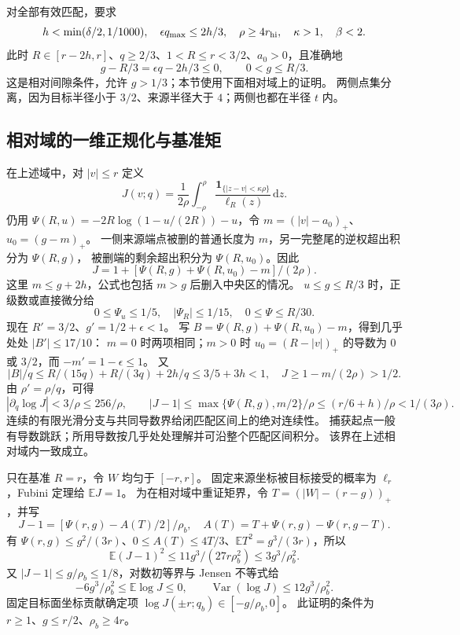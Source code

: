 \documentclass[UTF8,a4paper,11pt,fontset=fandol]{ctexart}
\theoremstyle{remark}
\newcommand{\one}{\mathbf 1}
\newcommand{\dint}{\,\mathrm d}
\begin{document}
对全部有效匹配，要求
\begin{equation}\label{eq:relative-guards}
 h<\min(\delta/2,1/1000),\quad\epsilon q_{\max}\le2h/3,
 \quad\rho\ge4r_{\rm hi},\quad\kappa>1,\quad\beta<2.
\end{equation}
此时 $R\in[r-2h,r]$、$q\ge2/3$、$1<R\le r<3/2$、$a_0>0$，且准确地
\[
 g-R/3=\epsilon q-2h/3\le0,\qquad0<g\le R/3.
\]
这是相对间隙条件，允许 $g>1/3$；本节使用下面相对域上的证明。
两侧点集分离，因为目标半径小于 $3/2$、来源半径大于 $4$；两侧也都在半径 $t$ 内。

\subsection{相对域的一维正规化与基准矩}\label{subsec:relative-J}
在上述域中，对 $|v|\le r$ 定义
\[
 J(v;q)=\frac1{2\rho}\int_{-\rho}^{\rho}
 \frac{\one_{\{|z-v|<\kappa\rho\}}}{\ell_R(z)}\dint z.
\]
仍用 $\Psi(R,u)=-2R\log(1-u/(2R))-u$，令
$m=(|v|-a_0)_+$、$u_0=(g-m)_+$。
一侧来源端点被删的普通长度为 $m$，另一完整尾的逆权超出积分为 $\Psi(R,g)$，
被删端的剩余超出积分为 $\Psi(R,u_0)$。因此
\begin{equation}\label{eq:relative-J-closed}
 J=1+[\Psi(R,g)+\Psi(R,u_0)-m]/(2\rho).
\end{equation}
这里 $m\le g+2h$，公式也包括 $m>g$ 后删入中央区的情况。
$u\le g\le R/3$ 时，正级数或直接微分给
\[
 0\le\Psi_u\le1/5,\quad|\Psi_R|\le1/15,\quad0\le\Psi\le R/30.
\]
现在 $R'=3/2$、$g'=1/2+\epsilon<1$。
写 $B=\Psi(R,g)+\Psi(R,u_0)-m$，得到几乎处处 $|B'|\le17/10$：
$m=0$ 时两项相同；$m>0$ 时 $u_0=(R-|v|)_+$ 的导数为 $0$ 或 $3/2$，而 $-m'=1-\epsilon\le1$。
又
\[
 |B|/q\le R/(15q)+R/(3q)+2h/q\le3/5+3h<1,
 \quad J\ge1-m/(2\rho)>1/2.
\]
由 $\rho'=\rho/q$，可得
\begin{equation}\label{eq:relative-J-derivative}
 |\partial_q\log J|<3/\rho\le256/\rho,\qquad
 |J-1|\le\max\{\Psi(R,g),m/2\}/\rho
 \le(r/6+h)/\rho<1/(3\rho).
\end{equation}
连续的有限光滑分支与共同导数界给闭匹配区间上的绝对连续性。
捕获起点一般有导数跳跃；所用导数按几乎处处理解并可沿整个匹配区间积分。
该界在上述相对域内一致成立。

只在基准 $R=r$，令 $W$ 均匀于 $[-r,r]$。
固定来源坐标被目标接受的概率为 $\ell_r$，Fubini 定理给 $\mathbb EJ=1$。
为在相对域中重证矩界，令 $T=(|W|-(r-g))_+$，并写
\[
 J-1=[\Psi(r,g)-A(T)/2]/\rho_b,\quad
 A(T)=T+\Psi(r,g)-\Psi(r,g-T).
\]
有 $\Psi(r,g)\le g^2/(3r)$、$0\le A(T)\le4T/3$、$\mathbb ET^2=g^3/(3r)$，所以
\[
 \mathbb E(J-1)^2\le11g^3/(27r\rho_b^2)\le3g^3/\rho_b^2.
\]
又 $|J-1|\le g/\rho_b\le1/8$，对数初等界与 Jensen 不等式给
\begin{equation}\label{eq:relative-baseline}
 -6g^3/\rho_b^2\le\mathbb E\log J\le0,\qquad
 \operatorname{Var}(\log J)\le12g^3/\rho_b^2.
\end{equation}
固定目标面坐标贡献确定项 $\log J(\pm r;q_b)\in[-g/\rho_b,0]$。
此证明的条件为 $r\ge1$、$g\le r/2$、$\rho_b\ge4r$。
\end{document}

